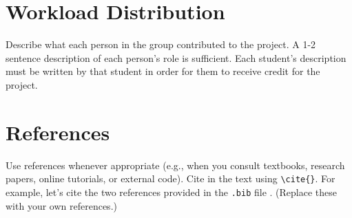 \documentclass[12pt]{article}
\begin{document}
\section{Workload Distribution}

Describe what each person in the group contributed
to the project. A 1-2 sentence description of each person's role is sufficient.
Each student's description must be written by that student in order for them
to receive credit for the project.


\section{References}

Use references whenever appropriate (e.g., when you consult textbooks, research papers, online tutorials, or external code). Cite in the text using \verb|\cite{}|. For example, let's cite the two references provided in the \texttt{.bib} file \cite{bishop2006prml,hastie2009esl}. (Replace these with your own references.)



\end{document}
